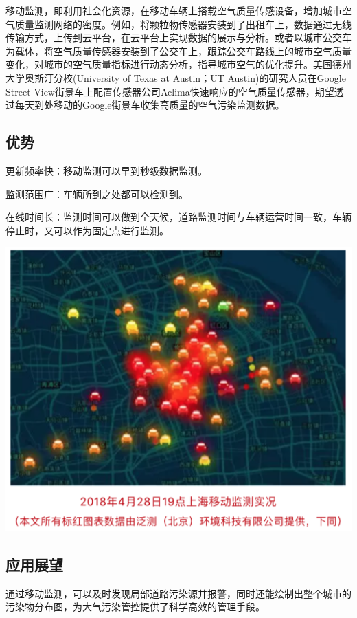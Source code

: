 \documentclass[]{book}
\begin{document}
移动监测，即利用社会化资源，在移动车辆上搭载空气质量传感设备，增加城市空气质量监测网络的密度。例如，将颗粒物传感器安装到了出租车上，数据通过无线传输方式，上传到云平台，在云平台上实现数据的展示与分析。或者以城市公交车为载体，将空气质量传感器安装到了公交车上，跟踪公交车路线上的城市空气质量变化，对城市的空气质量指标进行动态分析，指导城市空气的优化提升。美国德州大学奥斯汀分校(University of Texas at Austin；UT Austin)的研究人员在Google Street View街景车上配置传感器公司Aclima快速响应的空气质量传感器，期望透过每天到处移动的Google街景车收集高质量的空气污染监测数据。

\hypertarget{ux4f18ux52bf}{%
\subsection{优势}\label{ux4f18ux52bf}}

更新频率快：移动监测可以早到秒级数据监测。

监测范围广：车辆所到之处都可以检测到。

在线时间长：监测时间可以做到全天候，道路监测时间与车辆运营时间一致，车辆停止时，又可以作为固定点进行监测。

\includegraphics[width=6.67in]{images/dlyd2}

\hypertarget{ux5e94ux7528ux5c55ux671b}{%
\subsection{应用展望}\label{ux5e94ux7528ux5c55ux671b}}

通过移动监测，可以及时发现局部道路污染源并报警，同时还能绘制出整个城市的污染物分布图，为大气污染管控提供了科学高效的管理手段。
\end{document}
